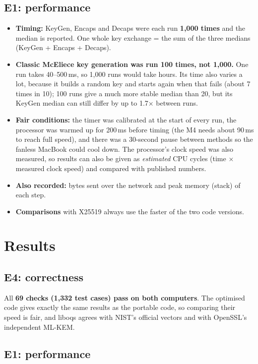 \documentclass[11pt,a4paper]{article}
\begin{document}
\subsection{E1: performance}
\begin{itemize}
  \item \textbf{Timing:} KeyGen, Encaps and Decaps were each run \textbf{1,000 times} and the median is
  reported. One whole key exchange = the sum of the three medians (KeyGen + Encaps + Decaps).
  \item \textbf{Classic McEliece key generation was run 100 times, not 1,000.} One run takes 40--500\,ms, so
  1,000 runs would take hours. Its time also varies a lot, because it builds a random key and starts again
  when that fails (about 7 times in 10); 100 runs give a much more stable median than 20, but its KeyGen median can still differ by up to 1.7× between runs.
  \item \textbf{Fair conditions:} the timer was calibrated at the start of every run, the processor was warmed
  up for 200\,ms before timing (the M4 needs about 90\,ms to reach full speed), and there was a 30-second
  pause between methods so the fanless MacBook could cool down. The processor's clock speed was also measured,
  so results can also be given as \emph{estimated} CPU cycles (time × measured clock speed) and compared with
  published numbers.
  \item \textbf{Also recorded:} bytes sent over the network and peak memory (stack) of each step.
  \item \textbf{Comparisons} with X25519 always use the faster of the two code versions.
\end{itemize}

\section{Results}
\subsection{E4: correctness}
All \textbf{69 checks (1,332 test cases) pass on both computers}. The optimised code gives exactly the same
results as the portable code, so comparing their speed is fair, and liboqs agrees with NIST's official
vectors and with OpenSSL's independent ML-KEM.

\subsection{E1: performance}
\begin{table}[t]
\centering\scriptsize\setlength{\tabcolsep}{3.6pt}

\caption{One whole key exchange: sum of the KeyGen, Encaps and Decaps medians. Portable = portable C; (\emph{n}×) after an optimised time = how many times faster it is than
portable C; -- = no optimised code. ``vs X25519'' compares with X25519 DH on the same computer, using the
faster version: below 1.00× means faster than X25519.}
\label{tab:e1}
\end{table}
\end{document}
